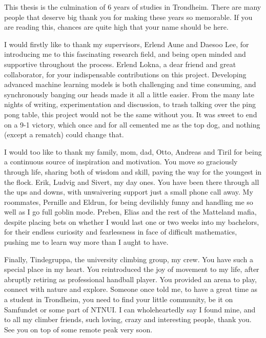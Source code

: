 \documentclass[../../thesis.tex]{subfiles}
\begin{document}
This thesis is the culmination of 6 years of studies in Trondheim. There are many people that deserve big thank you for making these years so memorable. If you are reading this, chances are quite high that your name should be here.\newline 

I would firstly like to thank my supervisors, Erlend Aune and Daesoo Lee, for introducing me to this fascinating research field, and being open minded and supportive throughout the process. Erlend Lokna, a dear friend and great collaborator, for your indispensable contributions on this project. Developing advanced machine learning models is both challenging and time consuming, and synchronously banging our heads made it all a little easier. From the many late nights of writing, experimentation and discussion, to trash talking over the ping pong table, this project would not be the same without you. It was sweet to end on a 9-1 victory, which once and for all cemented me as the top dog, and nothing (except a rematch) could change that.\newline

I would too like to thank my family, mom, dad, Otto, Andreas and Tiril for being a continuous source of inspiration and motivation. You move so graciously through life, sharing both of wisdom and skill, paving the way for the youngest in the flock. Erik, Ludvig and Sivert, my day ones. You have been there through all the ups and downs, with unwaivering support just a small phone call away. My roommates, Pernille and Eldrun, for being devilishly funny and handling me so well as I go full goblin mode. Preben, Elias and the rest of the Matteland mafia, despite placing bets on whether I would last one or two weeks into my bachelors, for their endless curiosity and fearlessness in face of difficult mathematics, pushing me to learn way more than I aught to have. \newline

Finally, Tindegruppa, the university climbing group, my crew. You have such a special place in my heart. You reintroduced the joy of movement to my life, after abruptly retiring as professional handball player. You provided an arena to play, connect with nature and explore. Someone once told me, to have a great time as a student in Trondheim, you need to find your little community, be it on Samfundet or some part of NTNUI. I can wholeheartedly say I found mine, and to all my climber friends, such loving, crazy and interesting people, thank you. See you on top of some remote peak very soon.
\end{document}
